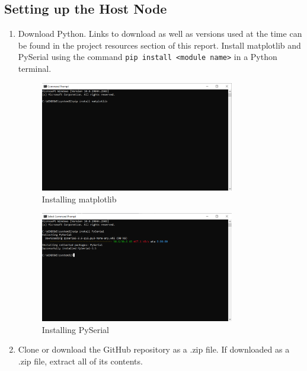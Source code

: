 \subsection{Setting up the Host Node}
\begin{enumerate}
\item Download Python. Links to download as well as versions used at the time can be found in the project resources section of this report. Install matplotlib and PySerial using the command \texttt{pip install <module name>} in a Python terminal.

\begin{figure}[H]
    \centering
    \includegraphics[width=0.8\textwidth]{Pictures/matplotlib install.png}
    \caption[Installing matplotlib]{Installing matplotlib} 
    \label{fig:part1commrin}
\end{figure}

\begin{figure}[H]
    \centering
    \includegraphics[width=0.8\textwidth]{Pictures/pyserial install.png}
    \caption[Installing PySerial]{Installing PySerial} 
    \label{fig:part1commrin}
\end{figure}

\item Clone or download the GitHub repository as a .zip file. If downloaded as a .zip file, extract all of its contents.


\end{enumerate}
